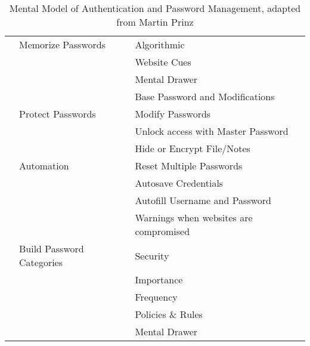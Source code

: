 \begin{table}[htpb]
\begin{threeparttable}
\begin{tabular} {l|l|l}
		& Memorize Passwords & Algorithmic \\ 
		&			& Website Cues \\
		& & Mental Drawer \\
		& & Base Password and Modifications \\ \cline{2-3}
		& Protect Passwords & Modify Passwords \\
		& 			& Unlock access with Master Password\\
		&			& Hide or Encrypt File/Notes \\ \cline{2-3}
		& Automation & Reset Multiple Passwords\\
		&  			& Autosave Credentials \\ 
		&			& Autofill Username and Password \\
		&			& Warnings when websites are compromised \\\cline{2-3}
		& Build Password Categories & Security \\ 
		&			& Importance \\
		&			& Frequency \\
		&			& Policies \& Rules \\
		&			& Mental Drawer \\ \hline

\end{tabular}
\end{threeparttable}
\caption{\label{tab:mm_pwm:mental-model-table}
	Mental Model of Authentication and Password Management, adapted from Martin Prinz \cite{Prinz2017Thesis}}
\end{table}